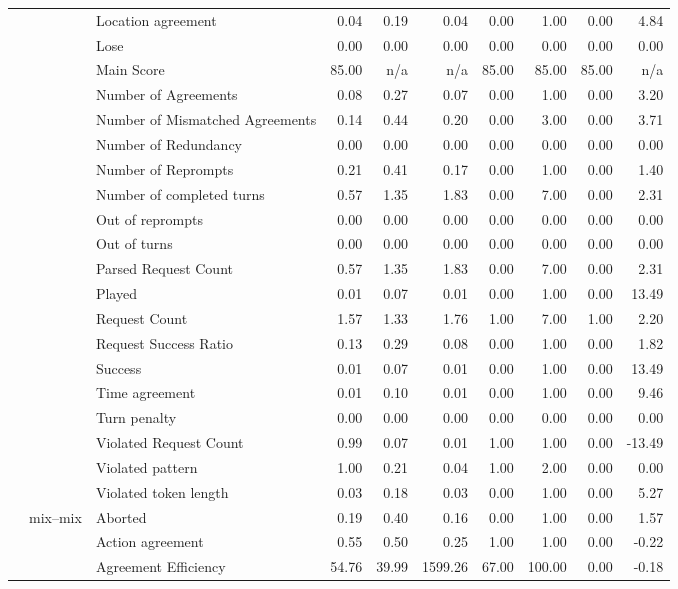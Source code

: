 \begin{tabular}{lllrrrrrrr}
 &  & Location agreement & 0.04 & 0.19 & 0.04 & 0.00 & 1.00 & 0.00 & 4.84 \\
 &  & Lose & 0.00 & 0.00 & 0.00 & 0.00 & 0.00 & 0.00 & 0.00 \\
 &  & Main Score & 85.00 & n/a & n/a & 85.00 & 85.00 & 85.00 & n/a \\
 &  & Number of Agreements & 0.08 & 0.27 & 0.07 & 0.00 & 1.00 & 0.00 & 3.20 \\
 &  & Number of Mismatched Agreements & 0.14 & 0.44 & 0.20 & 0.00 & 3.00 & 0.00 & 3.71 \\
 &  & Number of Redundancy & 0.00 & 0.00 & 0.00 & 0.00 & 0.00 & 0.00 & 0.00 \\
 &  & Number of Reprompts & 0.21 & 0.41 & 0.17 & 0.00 & 1.00 & 0.00 & 1.40 \\
 &  & Number of completed turns & 0.57 & 1.35 & 1.83 & 0.00 & 7.00 & 0.00 & 2.31 \\
 &  & Out of reprompts & 0.00 & 0.00 & 0.00 & 0.00 & 0.00 & 0.00 & 0.00 \\
 &  & Out of turns & 0.00 & 0.00 & 0.00 & 0.00 & 0.00 & 0.00 & 0.00 \\
 &  & Parsed Request Count & 0.57 & 1.35 & 1.83 & 0.00 & 7.00 & 0.00 & 2.31 \\
 &  & Played & 0.01 & 0.07 & 0.01 & 0.00 & 1.00 & 0.00 & 13.49 \\
 &  & Request Count & 1.57 & 1.33 & 1.76 & 1.00 & 7.00 & 1.00 & 2.20 \\
 &  & Request Success Ratio & 0.13 & 0.29 & 0.08 & 0.00 & 1.00 & 0.00 & 1.82 \\
 &  & Success & 0.01 & 0.07 & 0.01 & 0.00 & 1.00 & 0.00 & 13.49 \\
 &  & Time agreement & 0.01 & 0.10 & 0.01 & 0.00 & 1.00 & 0.00 & 9.46 \\
 &  & Turn penalty & 0.00 & 0.00 & 0.00 & 0.00 & 0.00 & 0.00 & 0.00 \\
 &  & Violated Request Count & 0.99 & 0.07 & 0.01 & 1.00 & 1.00 & 0.00 & -13.49 \\
 &  & Violated pattern & 1.00 & 0.21 & 0.04 & 1.00 & 2.00 & 0.00 & 0.00 \\
 &  & Violated token length & 0.03 & 0.18 & 0.03 & 0.00 & 1.00 & 0.00 & 5.27 \\
\cline{2-10}
 & \multirow[t]{27}{*}{mix--mix} & Aborted & 0.19 & 0.40 & 0.16 & 0.00 & 1.00 & 0.00 & 1.57 \\
 &  & Action agreement & 0.55 & 0.50 & 0.25 & 1.00 & 1.00 & 0.00 & -0.22 \\
 &  & Agreement Efficiency & 54.76 & 39.99 & 1599.26 & 67.00 & 100.00 & 0.00 & -0.18 \\

\end{tabular}

